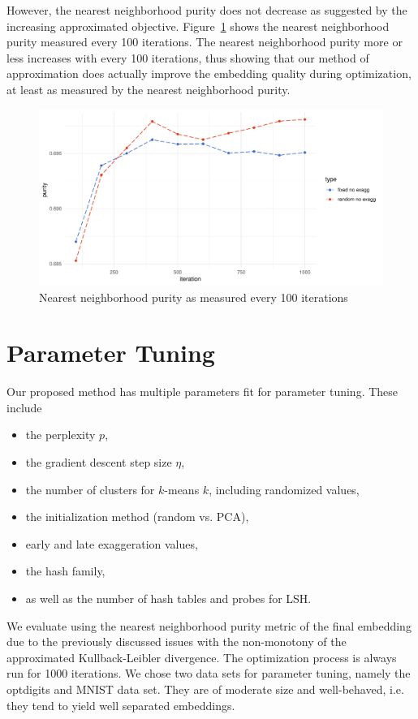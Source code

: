 However, the nearest neighborhood purity does not decrease as suggested by the increasing
approximated objective. Figure~\ref{fig:purity-comp} shows the nearest neighborhood
purity measured every 100 iterations. The nearest neighborhood purity more or less
increases with every 100 iterations, thus showing that our method of approximation
does actually improve the embedding quality during optimization, at least as measured
by the nearest neighborhood purity.

\begin{figure}[tb]
  \centering
  \includegraphics[width=.7\linewidth]{img/purity_it}
  \caption{Nearest neighborhood purity as measured every 100 iterations}
  \label{fig:purity-comp}
\end{figure}

\section{Parameter Tuning}

Our proposed method has multiple parameters fit for parameter tuning. These include

\begin{itemize}
  \item the perplexity $p$,
  \item the gradient descent step size $\eta$,
  \item the number of clusters for $k$-means $k$, including randomized values,
  \item the initialization method (random vs. PCA),
  \item early and late exaggeration values,
  \item the hash family,
  \item as well as the number of hash tables and probes for LSH.
\end{itemize}

We evaluate using the nearest neighborhood purity metric of the final embedding
due to the previously discussed issues with the non-monotony of the approximated
Kullback-Leibler divergence. The optimization process is always run for \num{1000}
iterations. We chose two data sets for parameter tuning, namely the optdigits and
MNIST data set. They are of moderate size and well-behaved, i.e. they tend to yield
well separated embeddings.

